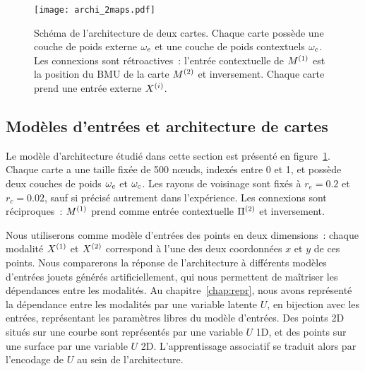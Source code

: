 \documentclass[../main]{subfiles}
\begin{document}
\begin{figure}
	\centering\texttt{[image: archi\_2maps.pdf]}
	\caption{Schéma de l'architecture de deux cartes. Chaque carte possède une couche de poids externe $\omega_e$ et une couche de poids contextuels $\omega_c$. Les connexions sont rétroactives~: l'entrée contextuelle de $M^{({1})}$ est la position du BMU de la carte $M^{({2})}$ et inversement. 
	Chaque carte prend une entrée externe $X^{({i})}$.\label{fig:archis}}
\end{figure}

\subsection{Modèles d'entrées et architecture de cartes}

Le modèle d'architecture étudié dans cette section est présenté en figure~\ref{fig:archis}.
Chaque carte a une taille fixée de 500 n\oe{}uds, indexés entre 0 et 1, et possède deux couches de poids $\omega_e$ et $\omega_c$. Les rayons de voisinage sont fixés à $r_e = 0.2$ et $r_c = 0.02$, sauf si précisé autrement dans l'expérience. Les connexions sont réciproques~: $M^{({1})}$ prend comme entrée contextuelle $\Pi^{({2})}$ et inversement.

Nous utiliserons comme modèle d'entrées des points en deux dimensions~: chaque modalité $X^{({1})}$ et $X^{({2})}$ correspond à l'une des deux coordonnées $x$ et $y$ de ces points. Nous comparerons la réponse de l'architecture à différents modèles d'entrées jouets générés artificiellement, qui nous permettent de maîtriser les dépendances entre les modalités.
Au chapitre~\ref{chap:repr}, nous avons représenté la dépendance entre les modalités par une variable latente $U$, en bijection avec les entrées, représentant les paramètres libres du modèle d'entrées. 
Des points 2D situés sur une courbe sont représentés par une variable $U$ 1D, et des points sur une surface par une variable $U$ 2D. L'apprentissage associatif se traduit alors par l'encodage de $U$ au sein de l'architecture.
\end{document}
